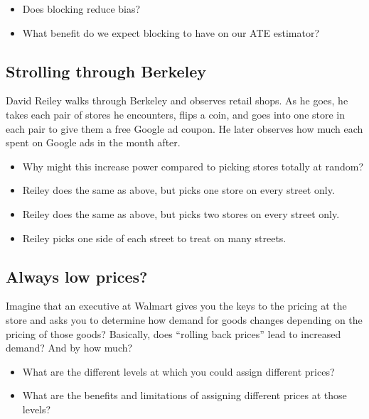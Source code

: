 \documentclass[
]{book}
\providecommand{\tightlist}{%
  \setlength{\itemsep}{0pt}\setlength{\parskip}{0pt}}
\begin{document}
\begin{itemize}
\tightlist
\item
  Does blocking reduce bias?
\item
  What benefit do we expect blocking to have on our ATE estimator?
\end{itemize}

\hypertarget{strolling-through-berkeley}{%
\subsection{Strolling through
Berkeley}\label{strolling-through-berkeley}}

David Reiley walks through Berkeley and observes retail shops. As he
goes, he takes each pair of stores he encounters, flips a coin, and goes
into one store in each pair to give them a free Google ad coupon. He
later observes how much each spent on Google ads in the month after.

\begin{itemize}
\tightlist
\item
  Why might this increase power compared to picking stores totally at
  random?
\item
  Reiley does the same as above, but picks one store on every street
  only.
\item
  Reiley does the same as above, but picks two stores on every street
  only.
\item
  Reiley picks one side of each street to treat on many streets.
\end{itemize}

\hypertarget{always-low-prices}{%
\subsection{Always low prices?}\label{always-low-prices}}

Imagine that an executive at Walmart gives you the keys to the pricing
at the store and asks you to determine how demand for goods changes
depending on the pricing of those goods? Basically, does ``rolling back
prices'' lead to increased demand? And by how much?

\begin{itemize}
\tightlist
\item
  What are the different levels at which you could assign different
  prices?
\item
  What are the benefits and limitations of assigning different prices at
  those levels?
\end{itemize}
\end{document}
